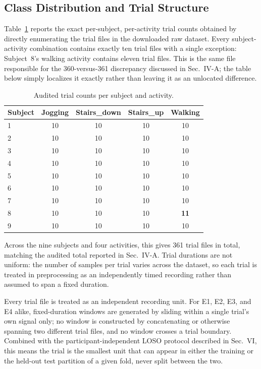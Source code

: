 \documentclass[conference]{IEEEtran}
\begin{document}
\subsection{Class Distribution and Trial Structure}

Table~\ref{tab:trial-distribution} reports the exact per-subject,
per-activity trial counts obtained by directly enumerating the trial
files in the downloaded raw dataset. Every subject-activity
combination contains exactly ten trial files with a single
exception: Subject~8's walking activity contains eleven trial files.
This is the same file responsible for the 360-versus-361 discrepancy
discussed in Sec.~IV-A; the table below simply localizes it exactly
rather than leaving it as an unlocated difference.

\begin{table}[t]
\centering
\caption{Audited trial counts per subject and activity.}
\label{tab:trial-distribution}
\begin{tabular}{lcccc}
\toprule
Subject & Jogging & Stairs\_down & Stairs\_up & Walking \\
\midrule
1 & 10 & 10 & 10 & 10 \\
2 & 10 & 10 & 10 & 10 \\
3 & 10 & 10 & 10 & 10 \\
4 & 10 & 10 & 10 & 10 \\
5 & 10 & 10 & 10 & 10 \\
6 & 10 & 10 & 10 & 10 \\
7 & 10 & 10 & 10 & 10 \\
8 & 10 & 10 & 10 & \textbf{11} \\
9 & 10 & 10 & 10 & 10 \\
\bottomrule
\end{tabular}
\end{table}

Across the nine subjects and four activities, this gives 361 trial
files in total, matching the audited total reported in Sec.~IV-A.
Trial durations are not uniform: the number of samples per trial
varies across the dataset, so each trial is treated in preprocessing
as an independently timed recording rather than assumed to span a
fixed duration.

Every trial file is treated as an independent recording unit. For
E1, E2, E3, and E4 alike, fixed-duration windows are generated by
sliding within a single trial's own signal only; no window is
constructed by concatenating or otherwise spanning two different
trial files, and no window crosses a trial boundary. Combined with
the participant-independent LOSO protocol described in Sec.~VI, this
means the trial is the smallest unit that can appear in either the
training or the held-out test partition of a given fold, never split
between the two.
\end{document}
